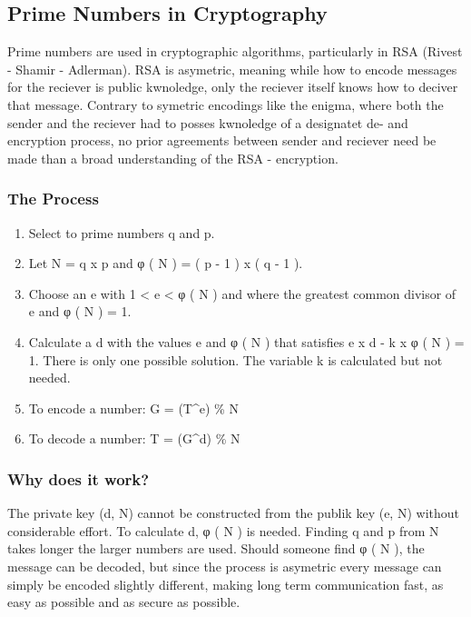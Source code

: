 \documentclass[11pt]{article}
\providecommand{\tightlist}{%
      \setlength{\itemsep}{0pt}\setlength{\parskip}{0pt}}
\begin{document}
    \hypertarget{prime-numbers-in-cryptography}{%
\subsection{Prime Numbers in
Cryptography}\label{prime-numbers-in-cryptography}}

Prime numbers are used in cryptographic algorithms, particularly in RSA
(Rivest - Shamir - Adlerman). RSA is asymetric, meaning while how to
encode messages for the reciever is public kwnoledge, only the reciever
itself knows how to deciver that message. Contrary to symetric encodings
like the enigma, where both the sender and the reciever had to posses
kwnoledge of a designatet de- and encryption process, no prior
agreements between sender and reciever need be made than a broad
understanding of the RSA - encryption.

\hypertarget{the-process}{%
\subsubsection{The Process}\label{the-process}}

\begin{enumerate}
\def\labelenumi{\arabic{enumi}.}
\tightlist
\item
  Select to prime numbers q and p.
\item
  Let N = q x p and φ ( N ) = ( p - 1 ) x ( q - 1 ).
\item
  Choose an e with 1 \textless{} e \textless{} φ ( N ) and where the
  greatest common divisor of e and φ ( N ) = 1.
\item
  Calculate a d with the values e and φ ( N ) that satisfies e x d - k x
  φ ( N ) = 1. There is only one possible solution. The variable k is
  calculated but not needed.
\item
  To encode a number: G = (T\^{}e) \% N
\item
  To decode a number: T = (G\^{}d) \% N
\end{enumerate}

\hypertarget{why-does-it-work}{%
\subsubsection{Why does it work?}\label{why-does-it-work}}

The private key (d, N) cannot be constructed from the publik key (e, N)
without considerable effort. To calculate d, φ ( N ) is needed. Finding
q and p from N takes longer the larger numbers are used. Should someone
find φ ( N ), the message can be decoded, but since the process is
asymetric every message can simply be encoded slightly different, making
long term communication fast, as easy as possible and as secure as
possible.
\end{document}
